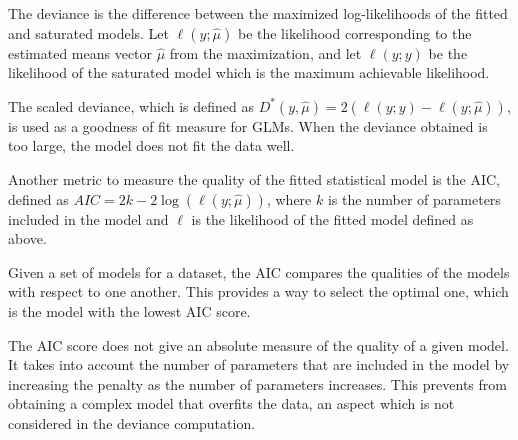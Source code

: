 The deviance is the difference between the maximized log-likelihoods of the fitted and saturated models. Let $\ell(y;\hat{\mu})$ be the likelihood corresponding to the estimated means vector $\hat{\mu}$ from the maximization, and let $\ell(y;y)$ be the likelihood of the saturated model which is the maximum achievable likelihood. 

The scaled deviance, which is defined as $ D^*(y,\hat{\mu}) = 2 (\ell(y;y)-\ell(y;\hat{\mu}) )$,
is used as a goodness of fit measure for GLMs. When the deviance obtained is too large, the model does not fit the data well. 

%

Another metric to measure the quality of the fitted statistical model is the AIC, defined as $AIC = 2k -2\log(\ell(y;\hat{\mu}))$, where $k$ is the number of parameters included in the model and $\ell$ is the likelihood of the fitted model defined as above.

 Given a set of models for a dataset, the AIC compares the qualities of the models with respect to one another. This provides a way to select the optimal one, which is the model with the lowest AIC score. 

The AIC score does not give an absolute measure of the quality of a given model. It takes into account the number of parameters that are included in the model by increasing the penalty as the number of parameters increases. This prevents from obtaining a complex model that overfits the data, an aspect which is not considered in the deviance computation.
 
%
%

